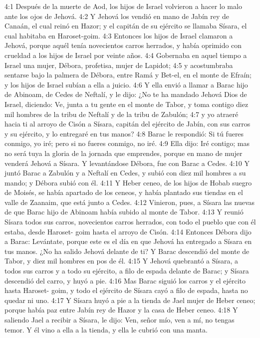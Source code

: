 4:1 Después de la muerte de Aod, los hijos de Israel volvieron a hacer lo malo ante los ojos de Jehová.  
4:2 Y Jehová los vendió en mano de Jabín rey de Canaán, el cual reinó en Hazor; y el capitán de su ejército se llamaba Sísara, el cual habitaba en Haroset-goim.  
4:3 Entonces los hijos de Israel clamaron a Jehová, porque aquél tenía novecientos carros herrados, y había oprimido con crueldad a los hijos de Israel por veinte años.  
4:4 Gobernaba en aquel tiempo a Israel una mujer, Débora, profetisa, mujer de Lapidot;  
4:5 y acostumbraba sentarse bajo la palmera de Débora, entre Ramá y Bet-el, en el monte de Efraín; y los hijos de Israel subían a ella a juicio.  
4:6 Y ella envió a llamar a Barac hijo de Abinoam, de Cedes de Neftalí, y le dijo: ¿No te ha mandado Jehová Dios de Israel, diciendo: Ve, junta a tu gente en el monte de Tabor, y toma contigo diez mil hombres de la tribu de Neftalí y de la tribu de Zabulón;  
4:7 y yo atraeré hacia ti al arroyo de Cisón a Sísara, capitán del ejército de Jabín, con sus carros y su ejército, y lo entregaré en tus manos?  
4:8 Barac le respondió: Si tú fueres conmigo, yo iré; pero si no fueres conmigo, no iré.  
4:9 Ella dijo: Iré contigo; mas no será tuya la gloria de la jornada que emprendes, porque en mano de mujer venderá Jehová a Sísara. Y levantándose Débora, fue con Barac a Cedes.  
4:10 Y juntó Barac a Zabulón y a Neftalí en Cedes, y subió con diez mil hombres a su mando; y Débora subió con él.  
4:11 Y Heber ceneo, de los hijos de Hobab suegro de Moisés, se había apartado de los ceneos, y había plantado sus tiendas en el valle de Zaanaim, que está junto a Cedes.  
4:12 Vinieron, pues, a Sísara las nuevas de que Barac hijo de Abinoam había subido al monte de Tabor.  
4:13 Y reunió Sísara todos sus carros, novecientos carros herrados, con todo el pueblo que con él estaba, desde Haroset- goim hasta el arroyo de Cisón.  
4:14 Entonces Débora dijo a Barac: Levántate, porque este es el día en que Jehová ha entregado a Sísara en tus manos. ¿No ha salido Jehová delante de ti? Y Barac descendió del monte de Tabor, y diez mil hombres en pos de él.  
4:15 Y Jehová quebrantó a Sísara, a todos sus carros y a todo su ejército, a filo de espada delante de Barac; y Sísara descendió del carro, y huyó a pie.  
4:16 Mas Barac siguió los carros y el ejército hasta Haroset- goim, y todo el ejército de Sísara cayó a filo de espada, hasta no quedar ni uno.  
4:17 Y Sísara huyó a pie a la tienda de Jael mujer de Heber ceneo; porque había paz entre Jabín rey de Hazor y la casa de Heber ceneo.  
4:18 Y saliendo Jael a recibir a Sísara, le dijo: Ven, señor mío, ven a mí, no tengas temor. Y él vino a ella a la tienda, y ella le cubrió con una manta.  
